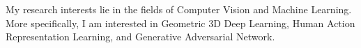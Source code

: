 


\begin{cventries}

\cvtext
{ %
\begin{cvitems}
    My research interests lie in the fields of Computer Vision and Machine Learning. More specifically, I am interested in Geometric 3D Deep Learning, Human Action Representation Learning, and Generative Adversarial Network.
\end{cvitems}
}


\end{cventries}
